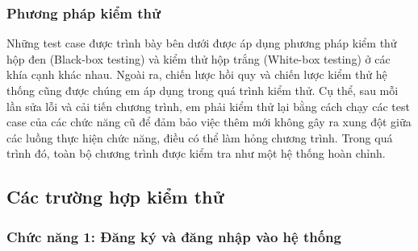 \documentclass[12pt,letterpaper]{article}
\begin{document}
\subsubsection{Phương pháp kiểm thử} Những test case được trình bày bên dưới được áp dụng phương pháp kiểm thử hộp đen (Black-box testing) và kiểm thử hộp trắng (White-box testing) ở các khía cạnh khác nhau. Ngoài ra, chiến lược hồi quy và chiến lược kiểm thử hệ thống cũng được chúng em áp dụng trong quá trình kiểm thử. Cụ thể, sau mỗi lần sửa lỗi và cải tiến chương trình, em phải kiểm thử lại bằng cách chạy các test case của các chức năng cũ để đảm bảo việc thêm mới không gây ra xung đột giữa các luồng thực hiện chức năng, điều có thể làm hỏng chương trình. Trong quá trình đó, toàn bộ chương trình được kiểm tra như một hệ thống hoàn chỉnh.
\subsection{Các trường hợp kiểm thử}
\subsubsection{Chức năng 1: Đăng ký và đăng nhập vào hệ thống}
\end{document}
